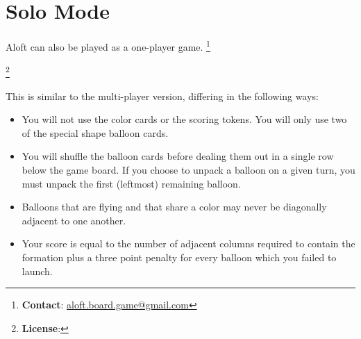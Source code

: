 \documentclass[a6paper, 11pt, parskip=half, DIV=15]{scrartcl}
\newcommand\blfootnote[1]{%
  \begingroup
  \renewcommand\thefootnote{}\footnote{#1}%
  \addtocounter{footnote}{-1}%
  \endgroup
}
\renewcommand{\thefootnote}{\fnsymbol{footnote}}
\begin{document}
\section*{Solo Mode}
Aloft can also be played as a one-player game.
\blfootnote{\textbf{Contact}: \href{mailto:aloft.board.game@gmail.com}{aloft.board.game@gmail.com}}
\blfootnote{\textbf{License}: \raggedright\doclicenseLongText}
This is similar to the multi-player version, differing in the following ways:
\begin{itemize}
  \item You will not use the color cards or the scoring tokens. You will only use two of the special shape balloon cards.
  \item You will shuffle the balloon cards before dealing them out in a single row below the game board. If you choose to unpack a balloon on a given turn, you must unpack the first (leftmost) remaining balloon.
  \item Balloons that are flying and that share a color may never be diagonally adjacent to one another.
  \item Your score is equal to the number of adjacent columns required to contain the formation plus a three point penalty for every balloon which you failed to launch.
\end{itemize}
 \newpage
\phantom{Aloft}
%
\end{document}
